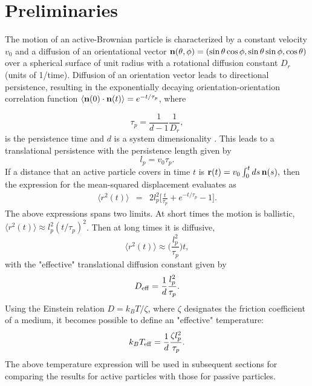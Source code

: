 \documentclass[pre,twocolumn,graphicx]{revtex4-1}
\newcommand{\ba}{\begin{eqnarray}}
\newcommand{\ea}{\end{eqnarray}}
\newcommand{\be}{\begin{equation}}
\newcommand{\ee}{\end{equation}}
\begin{document}
\section{Preliminaries}
\label{sec:preliminaries}

The motion of an active-Brownian particle is characterized by a constant velocity $v_0$ and a diffusion 
of an orientational vector ${\bf n}(\theta,\phi)=(\sin\theta\cos\phi,\sin\theta\sin\phi,\cos\theta)$ over a spherical
surface of unit radius with a rotational diffusion constant $D_r$ (units of 1/time). Diffusion of an orientation 
vector leads to directional persistence, resulting in the exponentially decaying orientation-orientation correlation 
function $\langle{\bf n}(0)\cdot{\bf n}(t)\rangle=e^{-t/\tau_p}$, where

\be
\tau_p = \frac{1}{d-1}\frac{1}{D_r}, 
\ee
is the persistence time and $d$ is a system dimensionality \cite{Lowen16}.  
This leads to a translational persistence with the persistence length given by 
\be
l_p = v_0\tau_p. 
\ee
If a distance that an active particle covers in time $t$ is 
$
{\bf r}(t) = v_0\int_0^tds\,{\bf n}(s),   
$
then the expression for the mean-squared displacement evaluates as 
\ba
\langle r^2(t)\rangle 
&=& 2l_p^2\bigg[\frac{t}{\tau_p} + e^{-t/\tau_p}-1\bigg].
\label{eq:msd}
\ea
The above expressions spans two limits.  At short times the motion is ballistic, 
$\langle r^2(t)\rangle \approx l_p^2(t/\tau_p)^2$.  Then at long times it is diffusive, 
\be
\langle r^2(t)\rangle \approx \bigg(\frac{l_p^2}{\tau_p}\bigg) t, 
\ee
with the "effective" translational diffusion constant given by 
\be
D_{\rm eff} = \frac{1}{d}\frac{l_p^2}{\tau_p}.  
\label{eq:Deff}
\ee
Using the Einstein relation $D=k_BT/\zeta$, where $\zeta$ designates the friction coefficient 
of a medium, it becomes possible to define an "effective" temperature:  
\be
k_BT_{\rm eff} = \frac{1}{d}\frac{\zeta l_p^2}{\tau_p}. 
\label{eq:kT}
\ee
The above temperature expression will be used in subsequent sections for comparing the 
results for active particles with those for passive particles.
\end{document}

